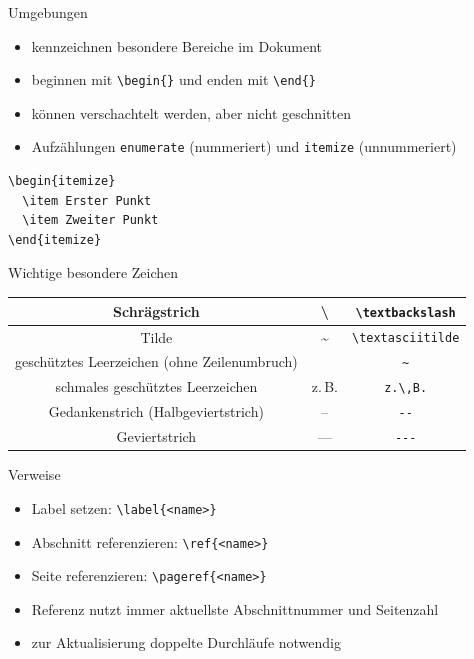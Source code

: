 \documentclass[presentation,aspectratio=169]{beamer}
\begin{document}
\begin{frame}[fragile]{Umgebungen}
  \begin{itemize}
    \item kennzeichnen besondere Bereiche im Dokument
    \item beginnen mit \verb|\begin{}| und enden mit \verb|\end{}|
    \item können verschachtelt werden, aber nicht geschnitten
    \item Aufzählungen \verb|enumerate| (nummeriert) und \verb|itemize| (unnummeriert)
  \end{itemize}
  \begin{center}
    \centering
    \begin{verbatim}
\begin{itemize}
  \item Erster Punkt
  \item Zweiter Punkt
\end{itemize}
    \end{verbatim}
  \end{center}
\end{frame}

\begin{frame}[fragile]{Wichtige besondere Zeichen}
  \begin{tabular}{c|c|c}
    Schrägstrich                                  & \textbackslash   & \verb|\textbackslash| \\
    \hline
    Tilde                                         & \textasciitilde  & \verb|\textasciitilde| \\
    \hline
    geschütztes Leerzeichen (ohne Zeilenumbruch)  & ~                & \verb|~| \\
    \hline
    schmales geschütztes Leerzeichen              & z.\,B.           & \verb|z.\,B.| \\
    \hline
    Gedankenstrich (Halbgeviertstrich)            & --               & \verb|--| \\
    \hline
    Geviertstrich                                 & ---              & \verb|---|
  \end{tabular}
\end{frame}

\begin{frame}[fragile]{Verweise}
  \begin{itemize}
    \item Label setzen: \verb|\label{<name>}|
    \item Abschnitt referenzieren: \verb|\ref{<name>}|
    \item Seite referenzieren: \verb|\pageref{<name>}|
    \item Referenz nutzt immer aktuellste Abschnittnummer und Seitenzahl
    \item zur Aktualisierung doppelte Durchläufe notwendig
  \end{itemize}
\end{frame}
\end{document}
